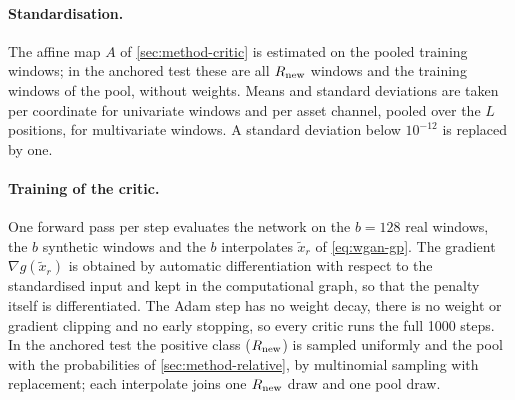 \paragraph{Standardisation.}
The affine map $A$ of \cref{sec:method-critic} is estimated on the pooled training windows; in
the anchored test these are all $R_{\mathrm{new}}$ windows and the training windows of the pool, without
weights. Means and standard deviations are taken per coordinate for univariate windows and per
asset channel, pooled over the $L$ positions, for multivariate windows. A standard deviation
below $10^{-12}$ is replaced by one.

\paragraph{Training of the critic.}
One forward pass per step evaluates the network on the $b=128$ real windows, the $b$ synthetic
windows and the $b$ interpolates $\tilde x_r$ of \eqref{eq:wgan-gp}. The gradient
$\nabla g(\tilde x_r)$ is obtained by automatic differentiation with respect to the
standardised input and kept in the computational graph, so that the penalty itself is
differentiated. The Adam step \citep{kingma_2015_adam} has no weight decay, there is no weight
or gradient clipping and no early stopping, so every critic runs the full 1000 steps. In the anchored test
the positive class ($R_{\mathrm{new}}$) is sampled uniformly and the pool with the probabilities of
\cref{sec:method-relative}, by multinomial sampling with replacement; each interpolate joins one
$R_{\mathrm{new}}$ draw and one pool draw.


